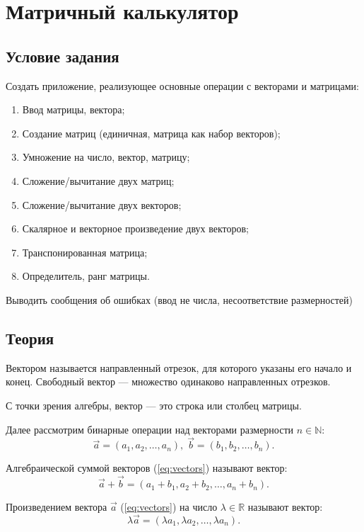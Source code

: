 \section{Матричный калькулятор}
\subsection{Условие задания}
Создать приложение,  реализующее основные операции с векторами и матрицами:

\begin{enumerate}
    \item Ввод матрицы, вектора;
    \item Создание матриц (единичная, матрица как набор векторов);
    \item Умножение на число, вектор, матрицу;
    \item Сложение/вычитание двух матриц;
    \item Сложение/вычитание двух векторов;
    \item Скалярное и векторное произведение двух векторов;
    \item Транспонированная матрица;
    \item Определитель, ранг матрицы.
\end{enumerate}

Выводить сообщения об ошибках (ввод не числа, несоответствие размерностей)

\subsection{Теория}
Вектором\cite{linal} называется направленный отрезок, для которого указаны его начало и конец. Свободный вектор --- множество одинаково направленных отрезков.

С точки зрения алгебры, вектор --- это строка или столбец матрицы.

Далее рассмотрим бинарные операции над векторами размерности $n \in \mathbb{N}$:
\begin{equation}
    \label{eq:vectors}
    \Vec{a} = \left(a_1, a_2, \dots, a_n\right),\;
    \Vec{b} = \left(b_1, b_2, \dots, b_n\right).
\end{equation}

Алгебраической суммой векторов (\ref{eq:vectors}) называют вектор:
\begin{equation}
    \Vec{a}+\Vec{b} = \left(a_1 + b_1, a_2 + b_2, \dots, a_n + b_n\right).
\end{equation}

Произведением вектора $\Vec{a}$ (\ref{eq:vectors}) на число $\lambda \in \mathbb{R}$ называют вектор:
\begin{equation}
    \lambda\Vec{a} = \left(\lambda a_1, \lambda a_2, \dots, \lambda a_n\right).
\end{equation}

